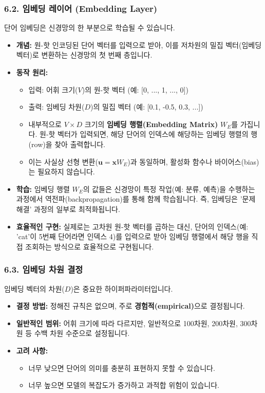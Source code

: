 \documentclass[11pt,a4paper]{article}
\begin{document}
\subsubsection*{6.2. 임베딩 레이어 (Embedding Layer)}
단어 임베딩은 신경망의 한 부분으로 학습될 수 있습니다.

\begin{itemize}
    \item \textbf{개념:} 원-핫 인코딩된 단어 벡터를 입력으로 받아, 이를 저차원의 밀집 벡터(임베딩 벡터)로 변환하는 신경망의 첫 번째 층입니다.
    \item \textbf{동작 원리:}
    \begin{itemize}
        \item 입력: 어휘 크기($V$)의 원-핫 벡터 (예: [0, ..., 1, ..., 0])
        \item 출력: 임베딩 차원($D$)의 밀집 벡터 (예: [0.1, -0.5, 0.3, ...])
        \item 내부적으로 $V \times D$ 크기의 \textbf{임베딩 행렬(Embedding Matrix)} $W_E$를 가집니다. 원-핫 벡터가 입력되면, 해당 단어의 인덱스에 해당하는 임베딩 행렬의 행(row)을 찾아 출력합니다.
        \item 이는 사실상 선형 변환($\mathbf{u} = \mathbf{x} W_E$)과 동일하며, 활성화 함수나 바이어스(bias)는 필요하지 않습니다.
    \end{itemize}
    \item \textbf{학습:} 임베딩 행렬 $W_E$의 값들은 신경망이 특정 작업(예: 분류, 예측)을 수행하는 과정에서 역전파(backpropagation)를 통해 함께 학습됩니다. 즉, 임베딩은 '문제 해결' 과정의 일부로 최적화됩니다.
    \item \textbf{효율적인 구현:} 실제로는 고차원 원-핫 벡터를 곱하는 대신, 단어의 인덱스(예: 'cat'이 5번째 단어라면 인덱스 4)를 입력으로 받아 임베딩 행렬에서 해당 행을 직접 조회하는 방식으로 효율적으로 구현됩니다.
\end{itemize}

\subsubsection*{6.3. 임베딩 차원 결정}
임베딩 벡터의 차원($D$)은 중요한 하이퍼파라미터입니다.

\begin{itemize}
    \item \textbf{결정 방법:} 정해진 규칙은 없으며, 주로 \textbf{경험적(empirical)}으로 결정됩니다.
    \item \textbf{일반적인 범위:} 어휘 크기에 따라 다르지만, 일반적으로 100차원, 200차원, 300차원 등 수백 차원 수준으로 설정됩니다.
    \item \textbf{고려 사항:}
    \begin{itemize}
        \item 너무 낮으면 단어의 의미를 충분히 표현하지 못할 수 있습니다.
        \item 너무 높으면 모델의 복잡도가 증가하고 과적합 위험이 있습니다.
    \end{itemize}
\end{itemize}
\end{document}
